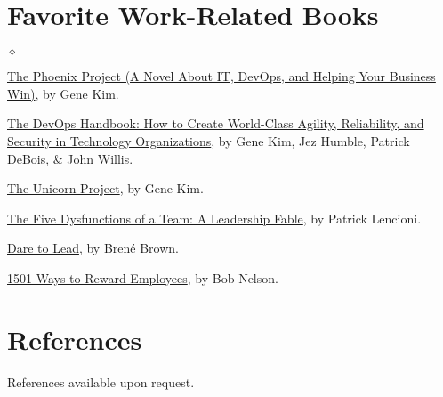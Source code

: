 \documentclass[margin,line,pifont,palatino,10pt]{res}
\begin{document}
\begin{resume}
\section{\sc Favorite Work-Related Books}
\begin{list}{$\diamond$}{\leftmargin=0.15in}
	\item \href{https://www.amazon.com/Phoenix-Project-DevOps-Helping-Business/dp/1942788290/ref=sr_1_2?dchild=1&keywords=gene+kim&qid=1616636863&sr=8-2}{The Phoenix Project (A Novel About IT, DevOps, and Helping Your Business Win)}, by Gene Kim.
	\item \href{https://www.amazon.com/DevOps-Handbook-World-Class-Reliability-Organizations/dp/1942788002/ref=sr_1_3?dchild=1&keywords=gene+kim&qid=1616636863&sr=8-3}{The DevOps Handbook:  How to Create World-Class Agility, Reliability, and Security in Technology Organizations}, by Gene Kim, Jez Humble, Patrick DeBois, \& John Willis.
	\item \href{https://www.amazon.com/Unicorn-Project-Developers-Disruption-Thriving/dp/1942788762/ref=sr_1_1?dchild=1&keywords=gene+kim&qid=1616636863&sr=8-1}{The Unicorn Project}, by Gene Kim.
	\item \href{https://www.amazon.com/Five-Dysfunctions-Team-Leadership-Fable/dp/0787960756/ref=sr_1_1?crid=3I8FG8CLI6P3R&dchild=1&keywords=five+dysfunctions+of+a+team&qid=1616637023&sprefix=five+dysf%2Caps%2C270&sr=8-1}{The Five Dysfunctions of a Team:  A Leadership Fable}, by Patrick Lencioni.
        \item \href{https://www.amazon.com/Dare-Lead-Brave-Conversations-Hearts/dp/0399592520/ref=sr_1_2?dchild=1&keywords=dare+to+lead+brene+brown&qid=1618494529&sr=8-2}{Dare to Lead}, by Bren\'e Brown.
	\item \href{https://www.amazon.com/1501-Reward-Employees-Nelson-Ph-D/dp/0761168788/ref=sr_1_1?crid=2BGYF4F8U4317&dchild=1&keywords=1501+ways+to+reward+employees+by+bob+nelson&qid=1616637149&sprefix=1501+ways%2Caps%2C265&sr=8-1}{1501 Ways to Reward Employees}, by Bob Nelson.
\end{list}





\vspace{1.5mm}
\section{\sc References}
References available upon request.

\end{resume}
\end{document}
